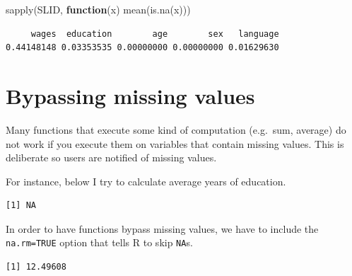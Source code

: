 \documentclass[
]{book}
\makeatletter
\newenvironment{Shaded}{\begin{snugshade}}{\end{snugshade}}
\newcommand{\AttributeTok}[1]{\textcolor[rgb]{0.61,0.61,0.61}{#1}}
\newcommand{\ConstantTok}[1]{\textcolor[rgb]{0,0,0}{#1}}
\newcommand{\ControlFlowTok}[1]{\textcolor[rgb]{0.27,0.27,0.27}{\textbf{#1}}}
\newcommand{\FunctionTok}[1]{\textcolor[rgb]{0,0,0}{#1}}
\newcommand{\NormalTok}[1]{#1}
\newcommand{\SpecialCharTok}[1]{\textcolor[rgb]{0,0,0}{#1}}
\newenvironment{kframe}{%
\medskip{}
\setlength{\fboxsep}{.8em}
 \def\at@end@of@kframe{}%
 \ifinner\ifhmode%
  \def\at@end@of@kframe{\end{minipage}}%
  \begin{minipage}{\columnwidth}%
 \fi\fi%
 \def\FrameCommand##1{\hskip\@totalleftmargin \hskip-\fboxsep
 \colorbox{shadecolor}{##1}\hskip-\fboxsep
     \hskip-\linewidth \hskip-\@totalleftmargin \hskip\columnwidth}%
 \MakeFramed {\advance\hsize-\width
   \@totalleftmargin\z@ \linewidth\hsize
   \@setminipage}}%
 {\par\unskip\endMakeFramed%
 \at@end@of@kframe}
\renewenvironment{Shaded}{\begin{kframe}}{\end{kframe}}
\makeatother
\begin{document}
\begin{Shaded}
\begin{Highlighting}[]
\FunctionTok{sapply}\NormalTok{(SLID, }\ControlFlowTok{function}\NormalTok{(x) }\FunctionTok{mean}\NormalTok{(}\FunctionTok{is.na}\NormalTok{(x)))}
\end{Highlighting}
\end{Shaded}

\begin{verbatim}
     wages  education        age        sex   language 
0.44148148 0.03353535 0.00000000 0.00000000 0.01629630 
\end{verbatim}

\hypertarget{bypassing-missing-values}{%
\section{Bypassing missing values}\label{bypassing-missing-values}}

Many functions that execute some kind of computation (e.g.~sum, average) do not work if you execute them on variables that contain missing values. This is deliberate so users are notified of missing values.

For instance, below I try to calculate average years of education.

\begin{Shaded}
\end{Shaded}

\begin{verbatim}
[1] NA
\end{verbatim}

In order to have functions bypass missing values, we have to include the \texttt{na.rm=TRUE} option that tells R to skip \texttt{NA}s.

\begin{Shaded}
\end{Shaded}

\begin{verbatim}
[1] 12.49608
\end{verbatim}
\end{document}
